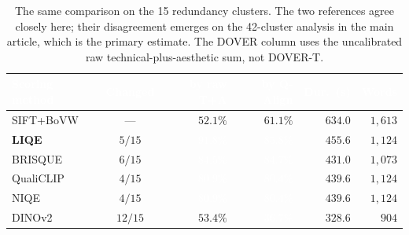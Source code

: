 \documentclass[sn-basic,Numbered]{sn-jnl}
\newcommand{\pfA}[1]{\cellcolor{perf5}\textcolor{white}{\textbf{#1}}}
\newcommand{\pfC}[1]{\cellcolor{perf3}#1}
\newcommand{\pfD}[1]{\cellcolor{perf2}#1}
\newcommand{\pfE}[1]{\cellcolor{perf1}\textcolor{white}{#1}}
\newcommand{\hd}[1]{\textcolor{white}{\textbf{#1}}}
\begin{document}
\begin{table}[!ht]
\centering
\caption{The same comparison on the 15 redundancy clusters. The two references
agree closely here; their disagreement emerges on the 42-cluster analysis in the main
article, which is the primary estimate. The DOVER column
uses the uncalibrated raw technical-plus-aesthetic sum, not DOVER-T.}
\label{tab:e2e15}
\small
\setlength{\tabcolsep}{4.5pt}
\renewcommand{\arraystretch}{1.14}
\begin{tabular}{@{}l c r r r r@{}}
\toprule
\rowcolor{headerblue}
\hd{Scoring method} & \hd{Changed} & \hd{by raw T+A} & \hd{by Q-Align} &
\hd{Dur.\ (s)} & \hd{Words} \\
\midrule
\rowcolor{focoauditado!12} SIFT+BoVW & --- & \pfD{$52.1\%$} & \pfC{$61.1\%$} & $634.0$ & $1{,}613$ \\
\midrule
\rowcolor{perf5!16} \textbf{LIQE}  & $5/15$ & \pfA{$91.8\%$} & \pfA{$85.8\%$} & $455.6$ & $1{,}124$ \\
\rowcolor{rowwhite} BRISQUE        & $6/15$ & \pfA{$84.5\%$} & \pfA{$84.7\%$} & $431.0$ & $1{,}073$ \\
\rowcolor{rowlight} QualiCLIP      & $4/15$ & \pfA{$80.9\%$} & \pfA{$80.4\%$} & $439.6$ & $1{,}124$ \\
\rowcolor{rowwhite} NIQE           & $4/15$ & \pfA{$80.9\%$} & \pfA{$80.4\%$} & $439.6$ & $1{,}124$ \\
\midrule
\rowcolor{rowlight} DINOv2         & $12/15$ & \pfD{$53.4\%$} & \pfE{$36.7\%$} & $328.6$ & $\ \,904$ \\
\bottomrule
\end{tabular}
\end{table}
\end{document}

